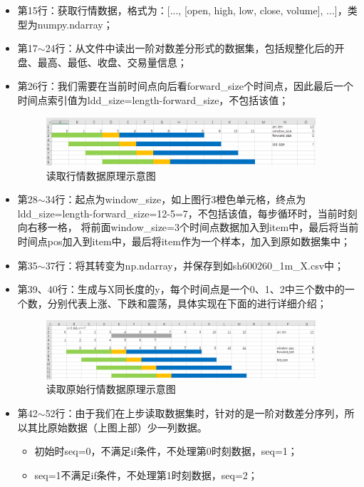 \begin{itemize}
    \item 第15行：获取行情数据，格式为：[..., [open, high, low, close, volume], ...]，类型为numpy.ndarray；
    \item 第17$\sim$24行：从文件中读出一阶对数差分形式的数据集，包括规整化后的开盘、最高、最低、收盘、交易量信息；
    \item 第26行：我们需要在当前时间点向后看forward\_size个时间点，因此最后一个时间点索引值为ldd\_size=length-forward\_size，不包括该值；
    \begin{figure}[H]
        \caption{读取行情数据原理示意图}
        \label{f000003}
        \centering
        \includegraphics[width=10cm]{images/f000003}
    \end{figure}
    \item 第28$\sim$34行：起点为window\_size，如上图行3橙色单元格，终点为ldd\_size=length-forward\_size=12-5=7，不包括该值，每步循环时，当前时刻向右移一格，
    将前面window\_size=3个时间点数据加入到item中，最后将当前时间点pos加入到item中，最后将item作为一个样本，加入到原如数据集中；
    \item 第35$\sim$37行：将其转变为np.ndarray，并保存到如sh600260\_1m\_X.csv中；
    \item 第39、40行：生成与X同长度的y，每个时间点是一个0、1、2中三个数中的一个数，分别代表上涨、下跌和震荡，具体实现在下面的进行详细介绍；
    \begin{figure}[H]
        \caption{读取原始行情数据原理示意图}
        \label{f000004}
        \centering
        \includegraphics[width=10cm]{images/f000004}
    \end{figure}
    \item 第42$\sim$52行：由于我们在上步读取数据集时，针对的是一阶对数差分序列，所以其比原始数据（上图上部）少一列数据。
    \begin{itemize}
        \item 初始时seq=0，不满足if条件，不处理第0时刻数据，seq=1；
        \item seq=1不满足if条件，不处理第1时刻数据，seq=2；

\end{itemize}
\end{itemize}
